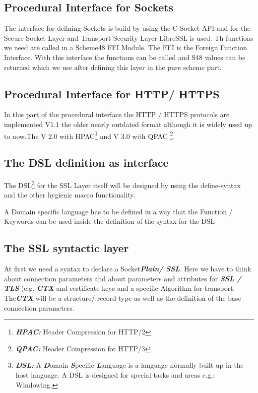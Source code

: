 \documentclass[10pt,a4paper,english]{article}
\newcommand{\abbrhighcol}[1]{\textbf{\textit{#1}}}
\begin{document}
\begin{multicols}{2}
\subsection{Procedural Interface for Sockets}
\begin{flushleft}
The interface for defining Sockets is build by using the C-Socket API and for the Secure Socket Layer and Transport Security Layer LibreSSL is used.
Th functions we need are called in a Scheme48 FFI Module. The FFI is the Foreign Function Interface. With this interface the functions can be called and S48 values can be returned which we use after defining this layer in the pure scheme part.
\end{flushleft}

\subsection{Procedural Interface for HTTP/ HTTPS}
\begin{flushleft}
In this part of the procedural interface the HTTP / HTTPS protocols are implemented V1.1 the older nearly outdated format although it is widely used up to now.The V 2.0 with HPAC\footnote{\abbrhighcol{HPAC: } Header Compression for HTTP/2} and V 3.0 with QPAC \footnote{\abbrhighcol{QPAC: } Header Compression for HTTP/3}.  
\end{flushleft}


\subsection{The DSL definition as interface}
\begin{flushleft}
The DSL\footnote{\abbrhighcol{DSL: } A \abbrhighcol {D}omain \abbrhighcol{S}pecific \abbrhighcol{L}anguage is a language normally built up in the host language. A DSL is designed for special tasks and areas e.g.: Windowing.} for the SSL Layer itself will be designed by using the define-syntax and the other hygienic macro functionality.
\end{flushleft}
A Domain specific language has to be defined in a way that the Function / Keywords can be used inside the definition of the syntax for the DSL

\subsection{The SSL syntactic layer}
\begin{flushleft}
 At first we need a syntax to declare a Socket\abbrhighcol  {Plain/ SSL}. Here we have to think about connection parameters and about parameters and attributes for \abbrhighcol  {SSL / TLS} (e.g. \abbrhighcol  {CTX} and certificate keys and a specific Algorithm for transport. 
The\abbrhighcol  {CTX} will be a structure/ record-type as well as the definition of the base connection parameters. 
\end{flushleft}


\end{multicols}
\end{document}
